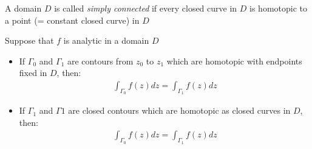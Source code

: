 \begin{theo}{}
  A domain $D$ is called \textit{simply connected}  if every closed curve in $D$ is homotopic to a point (= constant closed curve) in $D$
\end{theo}
\par\bigskip
\begin{theo}{}
  Suppose that $f$ is analytic in a domain $D$\par
  \begin{itemize}
    \item If $\Gamma_0$ and $\Gamma_1$ are contours from $z_0$ to $z_1$ which are homotopic with endpoints fixed in $D$, then:
      \begin{equation*}
        \begin{gathered}
          \int_{\Gamma_0}f(z)dz = \int_{\Gamma_1}f(z)dz
        \end{gathered}
      \end{equation*}
      \par\bigskip
    \item If $\Gamma_1$ and $\Gamma1$ are closed contours which are homotopic as closed curves in $D$, then:
      \begin{equation*}
        \begin{gathered}
          \int_{\Gamma_0}f(z)dz = \int_{\Gamma_1}f(z)dz
        \end{gathered}
      \end{equation*}
  \end{itemize}
\end{theo}
\newpage
